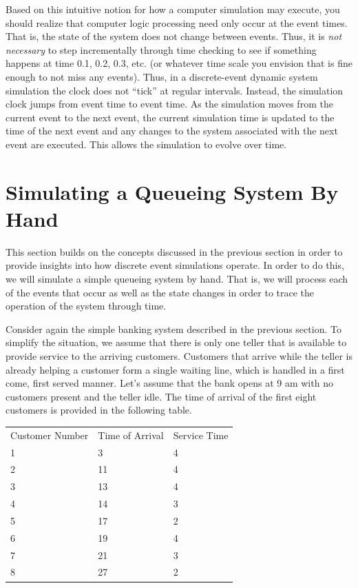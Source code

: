 \documentclass[
]{book}
\theoremstyle{definition}
\theoremstyle{definition}
\theoremstyle{definition}
\theoremstyle{definition}
\theoremstyle{remark}
\begin{document}
Based on this intuitive notion for how a computer simulation may
execute, you should realize that computer logic processing need only
occur at the event times. That is, the state of the system does not
change between events. Thus, it is \emph{not necessary} to step incrementally
through time checking to see if something happens at time 0.1, 0.2, 0.3,
etc. (or whatever time scale you envision that is fine enough to not
miss any events). Thus, in a discrete-event dynamic system simulation the clock does not
``tick'' at regular intervals. Instead, the simulation clock jumps from
event time to event time. As the simulation moves from the current event
to the next event, the current simulation time is updated to the time of
the next event and any changes to the system associated with the next
event are executed. This allows the simulation to evolve over time.

\hypertarget{simulating-a-queueing-system-by-hand}{%
\section{Simulating a Queueing System By Hand}\label{simulating-a-queueing-system-by-hand}}

This section builds on the concepts discussed in the previous section in order to provide insights into how discrete event simulations operate. In order to do this, we will simulate a simple queueing system by hand. That is, we will process each of the events that occur as well as the state changes in order to trace the operation of the system through time.

Consider again the simple banking system described in the previous
section. To simplify the situation, we assume that there is only one
teller that is available to provide service to the arriving customers.
Customers that arrive while the teller is already helping a customer
form a single waiting line, which is handled in a first come, first
served manner. Let's assume that the bank opens at 9 am with no
customers present and the teller idle. The time of arrival of the first
eight customers is provided in the following table.

\begin{longtable}[]{@{}lll@{}}
\toprule
\endhead
Customer Number & Time of Arrival & Service Time \\
1 & 3 & 4 \\
2 & 11 & 4 \\
3 & 13 & 4 \\
4 & 14 & 3 \\
5 & 17 & 2 \\
6 & 19 & 4 \\
7 & 21 & 3 \\
8 & 27 & 2 \\
\bottomrule
\end{longtable}
\end{document}
